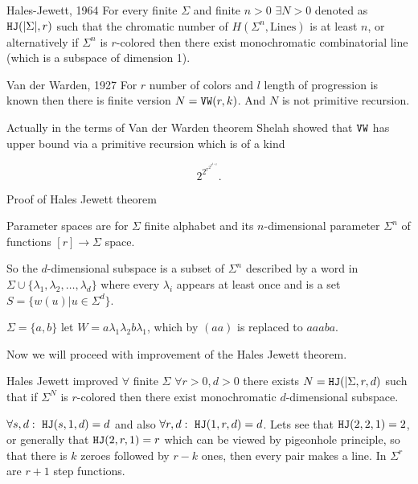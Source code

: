 \begin{thm}{Hales-Jewett, 1964}
	For every finite $\Sigma$ and finite $n > 0$ $\exists N > 0$ denoted as $\mathtt{HJ} (|\Sigma|, r)$ such that the chromatic number of $H(\Sigma^n, \text{Lines})$ is at least $n$, or alternatively if $\Sigma^n$ is $r$-colored then there exist monochromatic combinatorial line (which is a subspace of dimension 1).
\end{thm}

\begin{thm}{Van der Warden, 1927}
	For $r$ number of colors and $l$ length of progression is known then there is finite version $N = \mathtt{VW}(r,k)$. And $N$ is not primitive recursion.
\end{thm}

Actually in the terms of Van der Warden theorem Shelah showed that $\mathtt{VW}$ has upper bound via a primitive recursion which is of a kind

$$
2^{2^{r^{2^{2^{k+q}}}}}.
$$

\newpage

\begin{topic}{Proof of Hales Jewett theorem}
	\begin{defn}
		Parameter spaces are for $\Sigma$ finite alphabet and its $n$-dimensional parameter $\Sigma^n$ of functions $[r] \to \Sigma$ space.
	\end{defn}

	So the $d$-dimensional subspace is a subset of $\Sigma^n$ described by a word in $\Sigma \cup \{\lambda_1, \lambda_2, \dots, \lambda_d\}$ where every $\lambda_i$ appears at least once and is a set $S = \{w(u) | u \in \Sigma^d\}$.
	
	\begin{example}
		$\Sigma = \{a,b\}$ let $W = a \lambda_1 \lambda_2 b \lambda_1$, which by $(aa)$ is replaced to $aaaba$.
	\end{example}

	Now we will proceed with improvement of the Hales Jewett theorem.
	
	\begin{thm}{Hales Jewett improved}
		$\forall$ finite $\Sigma$ $\forall r > 0, d > 0$ there exists $N = \mathtt{HJ}(|\Sigma, r, d)$ such that if $\Sigma^N$ is $r$-colored then there exist monochromatic $d$-dimensional subspace.
		\label{hj-imrpov}
	\end{thm}

	\begin{observ}
		$\forall s, d: \ \mathtt{HJ} (s, 1, d) = d$ and also $\forall r, d: \ \mathtt{HJ}(1, r, d) = d$. Lets see that $\mathtt{HJ}(2,2,1) = 2$, or generally that $\mathtt{HJ}(2,r,1) = r$ which can be viewed by pigeonhole principle, so that there is $k$ zeroes followed by $r - k$ ones, then every pair makes a line. In $\Sigma^r$ are $r + 1$ step functions.
	\end{observ}
\end{topic}